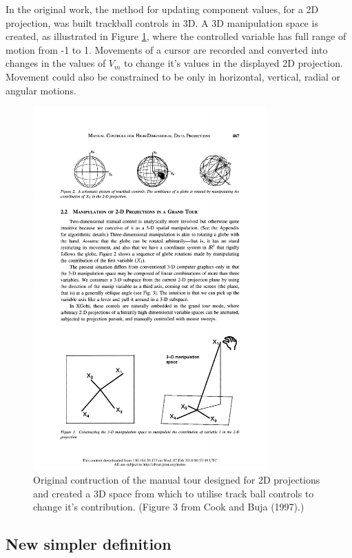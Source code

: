 \documentclass[]{interact}
\theoremstyle{plain}%
\theoremstyle{definition}
\theoremstyle{remark}
\begin{document}
In the original work, the method for updating component values, for a 2D
projection, was built trackball controls in 3D. A 3D manipulation space
is created, as illustrated in Figure \ref{manipspace}, where the
controlled variable has full range of motion from -1 to 1. Movements of
a cursor are recorded and converted into changes in the values of
\(V_m\) to change it's values in the displayed 2D projection. Movement
could also be constrained to be only in horizontal, vertical, radial or
angular motions.

\begin{figure}[ht]
\centerline{\includegraphics[width=0.8\textwidth]{figures/manip_space.pdf}}
\caption{Original contruction of the manual tour designed for 2D projections and created a 3D space from which to utilise track ball controls to change it's contribution. (Figure 3 from Cook and Buja (1997).)}
\label{manipspace}
\end{figure}

\hypertarget{new-simpler-definition}{%
\subsection{New simpler definition}\label{new-simpler-definition}}
\end{document}
